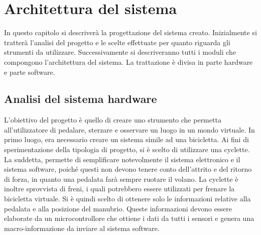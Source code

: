 \chapter{Architettura del sistema}
\label{architettura}
\thispagestyle{empty}

\noindent In questo capitolo si descriverà la progettazione del sistema creato. Inizialmente si tratterà l'analisi del progetto e le scelte effettuate per quanto riguarda gli strumenti da utilizzare. Successivamente si descriveranno tutti i moduli che compongono l'architettura del sistema. La trattazione è divisa in parte hardware e parte software.
\section{Analisi del sistema hardware}
L'obiettivo del progetto è quello di creare uno strumento che permetta all'utilizzatore di pedalare, sterzare e osservare un luogo in un mondo virtuale. In primo luogo, era necessario creare un sistema simile ad una bicicletta. Ai fini di sperimentazione della tipologia di progetto, si è scelto di utilizzare una cyclette. La suddetta, permette di semplificare notevolmente il sistema elettronico e il sistema software, poiché questi non devono tenere conto dell'attrito e del ritorno di forza, in quanto una pedalata farà sempre ruotare il volano. La cyclette è inoltre sprovvista di freni, i quali potrebbero essere utilizzati per frenare la bicicletta virtuale. Si è quindi scelto di ottenere solo le informazioni relative alla pedalata e alla posizione del manubrio. Queste informazioni devono essere elaborate da un microcontrollore che ottiene i dati da tutti i sensori e genera una macro-informazione da inviare al sistema software.

